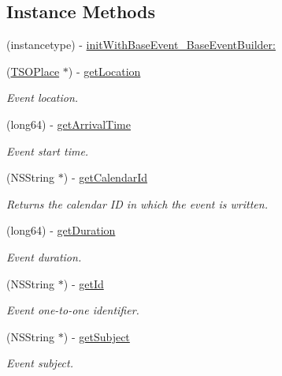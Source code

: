 \subsection*{Instance Methods}
\begin{DoxyCompactItemize}
\item 
(instancetype) -\/ \hyperlink{interface_base_event_ae79385e6fd1e96d0f0cc17a9b1df9ab5}{init\+With\+Base\+Event\+\_\+\+Base\+Event\+Builder\+:}
\item 
(\hyperlink{interface_t_s_o_place}{T\+S\+O\+Place} $\ast$) -\/ \hyperlink{interface_base_event_ac6024f9a94d21c69b6279ba965600301}{get\+Location}
\begin{DoxyCompactList}\small\item\em Event location. \end{DoxyCompactList}\item 
(long64) -\/ \hyperlink{interface_base_event_a37d6a6ab180647f517cae75137c91b32}{get\+Arrival\+Time}
\begin{DoxyCompactList}\small\item\em Event start time. \end{DoxyCompactList}\item 
(N\+S\+String $\ast$) -\/ \hyperlink{interface_base_event_a183986d8f6c728edba174569a5b07700}{get\+Calendar\+Id}
\begin{DoxyCompactList}\small\item\em Returns the calendar I\+D in which the event is written. \end{DoxyCompactList}\item 
(long64) -\/ \hyperlink{interface_base_event_aaaf50d1e852caaed683b9b4a35b47606}{get\+Duration}
\begin{DoxyCompactList}\small\item\em Event duration. \end{DoxyCompactList}\item 
(N\+S\+String $\ast$) -\/ \hyperlink{interface_base_event_a04588643c661c925966214f42f4c9f3f}{get\+Id}
\begin{DoxyCompactList}\small\item\em Event one-\/to-\/one identifier. \end{DoxyCompactList}\item 
(N\+S\+String $\ast$) -\/ \hyperlink{interface_base_event_ad6eb9f816ce7c59bbd2c8d029cc27f33}{get\+Subject}
\begin{DoxyCompactList}\small\item\em Event subject. \end{DoxyCompactList}\item 

\end{DoxyCompactItemize}
